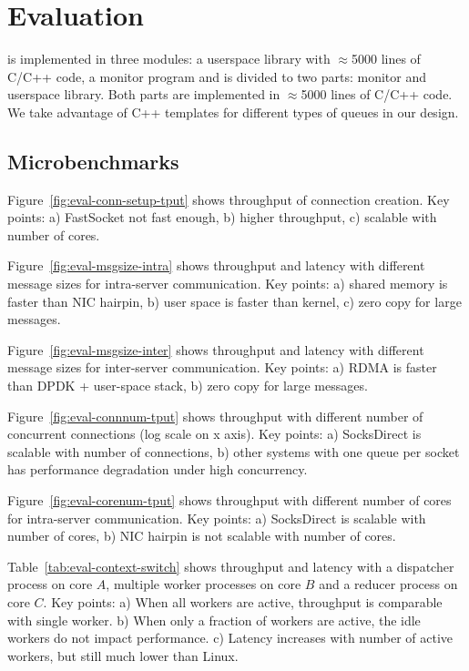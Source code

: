 \section{Evaluation}
\label{sec:evaluation}

\sys is implemented in three modules: a userspace library \libipc{} with $\approx$5000 lines of C/C++ code, a monitor program and  is divided to two parts: monitor and userspace library. Both parts are implemented in $\approx$5000 lines of C/C++ code. We take advantage of C++ templates for different types of queues in our design.

\subsection{Microbenchmarks}

Figure~\ref{fig:eval-conn-setup-tput} shows throughput of connection creation. Key points: a) FastSocket not fast enough, b) higher throughput, c) scalable with number of cores.

Figure~\ref{fig:eval-msgsize-intra} shows throughput and latency with different message sizes for intra-server communication. Key points: a) shared memory is faster than NIC hairpin, b) user space is faster than kernel, c) zero copy for large messages.

Figure~\ref{fig:eval-msgsize-inter} shows throughput and latency with different message sizes for inter-server communication. Key points: a) RDMA is faster than DPDK + user-space stack, b) zero copy for large messages.

Figure~\ref{fig:eval-connnum-tput} shows throughput with different number of concurrent connections (log scale on x axis). Key points: a) SocksDirect is scalable with number of connections, b) other systems with one queue per socket has performance degradation under high concurrency.

Figure~\ref{fig:eval-corenum-tput} shows throughput with different number of cores for intra-server communication. Key points: a) SocksDirect is scalable with number of cores, b) NIC hairpin is not scalable with number of cores.

Table~\ref{tab:eval-context-switch} shows throughput and latency with a dispatcher process on core $A$, multiple worker processes on core $B$ and a reducer process on core $C$. Key points: a) When all workers are active, throughput is comparable with single worker. b) When only a fraction of workers are active, the idle workers do not impact performance. c) Latency increases with number of active workers, but still much lower than Linux.

